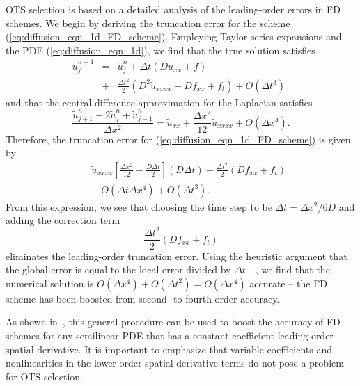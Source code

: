 \documentclass[twocolumn]{article} %
\newcommand{\beq}{\begin{equation}}
\newcommand{\eeq}{\end{equation}}
\newcommand{\bea}{\begin{eqnarray}}
\newcommand{\eea}{\end{eqnarray}}
\def\tu{\tilde{u}}
\def\dt{\Delta t}
\def\dx{\Delta x}
\begin{document}
OTS selection is based on a detailed analysis of the leading-order errors in 
FD schemes.  We begin by deriving the truncation error for the scheme 
(\ref{eq:diffusion_eqn_1d_FD_scheme}).  Employing Taylor series expansions and 
the PDE (\ref{eq:diffusion_eqn_1d}), we find that the true solution satisfies
\bea
  \tu^{n+1}_j &=& \tu^{n}_j
  + \dt \left( D \tu_{xx} + f \right)
  \nonumber \\
  &+& \frac{\dt^2}{2} \left( D^2 \tu_{xxxx} + D f_{xx} + f_t \right)
  + O \left( \dt^3 \right) \ \ 
  \label{eq:diffusion_eqn_1d_time_err}
\eea
and that the central difference approximation for the Laplacian satisfies
\beq
  \frac{\tu^{n}_{j+1} -2 \tu^{n}_j + \tu^{n}_{j-1}}{\dx^2}  =
  \tu_{xx} + \frac{\dx^2}{12} \tu_{xxxx}
  + O(\dx^4).
  \label{eq:diffusion_eqn_1d_space_err}
\eeq
Therefore, the truncation error for (\ref{eq:diffusion_eqn_1d_FD_scheme})
is given by
\bea
  & & \tu_{xxxx}
  \left[ \frac{\dx^2}{12} - \frac{D \dt}{2} \right] (D \dt)
  - \frac{\dt^2}{2} \left( D f_{xx}
  + f_t \right)
  \nonumber \\
  & & + \ O(\dt \dx^4) + O(\dt^3).
  \label{eq:diffusion_eqn_1d_trunc_err}
\eea
From this expression, we see that choosing the time step to be
$\dt = \dx^2/6D$ and adding the correction term 
\beq
  \frac{\dt^2}{2} \left( D f_{xx} + f_t \right)
\eeq
eliminates the leading-order truncation error.  Using the heuristic
argument that the global error is equal to the local error divided by 
$\dt$~~\cite{gko_book}, we find that the numerical solution is 
$O(\dx^4) + O(\dt^2) = O(\dx^4)$ accurate -- the FD scheme has been
boosted from second- to fourth-order accuracy.

As shown in~\cite{chu_otspde}, this general procedure can be used to boost 
the accuracy of FD schemes for any semilinear PDE that has a constant 
coefficient leading-order spatial derivative.  It is important to emphasize 
that variable coefficients and nonlinearities in the lower-order spatial 
derivative terms do not pose a problem for OTS selection.  
\end{document}
